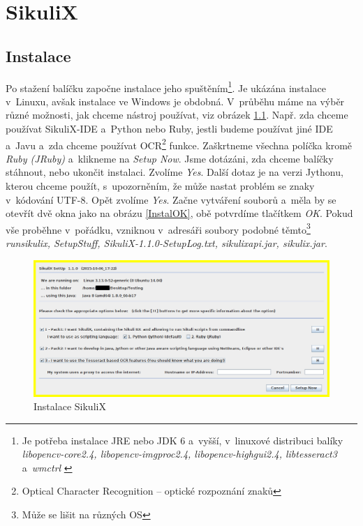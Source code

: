\chapter{SikuliX}
	\section{Instalace}
	Po stažení balíčku započne instalace jeho spuštěním\footnote{Je potřeba instalace JRE nebo JDK 6 a~vyšší, v~linuxové distribuci balíky \emph{libopencv-core2.4, libopencv-imgproc2.4, libopencv-highgui2.4, libtesseract3} a~\emph{wmctrl} \citep{SikuliX}}. Je ukázána instalace v~Linuxu, avšak instalace ve Windows je obdobná. V~průběhu máme na výběr různé možnosti, jak chceme nástroj používat, viz obrázek \ref{Instal}. Např. zda chceme používat SikuliX-IDE a~Python nebo Ruby, jestli budeme používat jiné IDE a~Javu a~zda chceme používat OCR\footnote{Optical Character Recognition -- optické rozpoznání znaků} funkce. Zaškrtneme všechna políčka kromě \emph{Ruby (JRuby)} a~klikneme na \emph{Setup Now}. Jsme dotázáni, zda chceme balíčky stáhnout, nebo ukončit instalaci. Zvolíme \emph{Yes}. Další dotaz je na verzi Jythonu, kterou chceme použít, s~upozorněním, že může nastat problém se znaky v~kódování UTF-8. Opět zvolíme \emph{Yes}. Začne vytváření souborů a~měla by se otevřít dvě okna jako na obrázu \ref{InstalOK}, obě potvrdíme tlačítkem \emph{OK}. Pokud vše proběhne v~pořádku, vzniknou v~adresáři soubory podobné těmto\footnote{Může se lišit na různých OS} \emph{runsikulix, SetupStuff, SikuliX-1.1.0-SetupLog.txt, sikulixapi.jar, sikulix.jar}.
	\begin{figure}[ht!]
		\centering
		\caption{Instalace SikuliX}
		\label{Instal}
		\includegraphics[width=13.5cm]{img/Instalace/Instalace.png}
	\end{figure}
